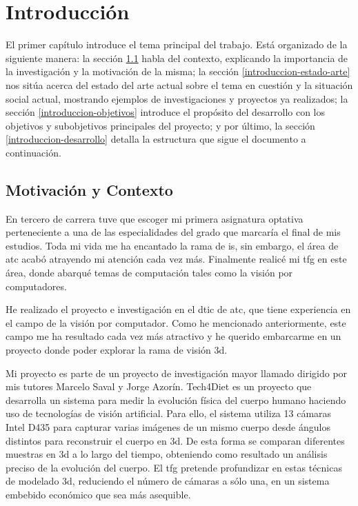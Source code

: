 \chapter{Introducción}

El primer capítulo introduce el tema principal del trabajo.
Está organizado de la siguiente manera:
la sección \ref{introduccion-motivacion-contexto} habla del contexto, explicando la importancia de la investigación y la motivación de la misma;
la sección \ref{introduccion-estado-arte} nos sitúa acerca del estado del arte actual sobre el tema en cuestión y la situación social actual, mostrando ejemplos de investigaciones y proyectos ya realizados;
la sección \ref{introduccion-objetivos} introduce el propósito del desarrollo con los objetivos y subobjetivos principales del proyecto;
y por último, la sección \ref{introduccion-desarrollo} detalla la estructura que sigue el documento a continuación.

\section{Motivación y Contexto}
\label{introduccion-motivacion-contexto}

En tercero de carrera tuve que escoger mi primera asignatura optativa perteneciente a una de las especialidades del grado que marcaría el final de mis estudios.
Toda mi vida me ha encantado la rama de \gls{is}, sin embargo, el área de \gls{atc} acabó atrayendo mi atención cada vez más.
Finalmente realicé mi \gls{tfg} en este área, donde abarqué temas de computación tales como la visión por computadores.

He realizado el proyecto e investigación en el \gls{dtic} de \gls{atc}, que tiene experiencia en el campo de la visión por computador.
Como he mencionado anteriormente, este campo me ha resultado cada vez más atractivo y he querido embarcarme en un proyecto donde poder explorar la rama de visión \gls{3d}.

Mi proyecto es parte de un proyecto de investigación mayor llamado \cite{Tech4DietResultados} dirigido por mis tutores Marcelo Saval y Jorge Azorín.
Tech4Diet es un proyecto que desarrolla un sistema para medir la evolución física del cuerpo humano haciendo uso de tecnologías de visión artificial.
Para ello, el sistema utiliza 13 cámaras Intel D435 para capturar varias imágenes de un mismo cuerpo desde ángulos distintos para reconstruir el cuerpo en \gls{3d}.
De esta forma se comparan diferentes muestras en \gls{3d} a lo largo del tiempo, obteniendo como resultado un análisis preciso de la evolución del cuerpo.
El \gls{tfg} pretende profundizar en estas técnicas de modelado \gls{3d}, reduciendo el número de cámaras a sólo una, en un sistema embebido económico que sea más asequible.

